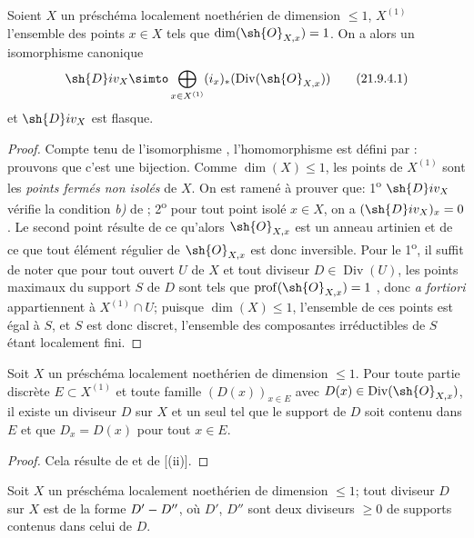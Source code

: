 \begin{proposition}[21.9.4]
\label{IV.21.9.4}
Soient $X$ un préschéma localement noethérien de dimension $\leq1$, $X^{(1)}$ l'ensemble des points $x\in X$ tels que $\dim(\sh{O}_{X,x})=1$.
On a alors un isomorphisme canonique
\[
\label{IV.21.9.4.1}
  \sh{D}iv_X\simto\bigoplus_{x\in X^{(1)}}(i_x)_*(\operatorname{Div}(\sh{O}_{X,x}))
  \tag{21.9.4.1}
\]
et $\sh{D}iv_X$ est flasque.
\end{proposition}

\begin{proof}
Compte tenu de l'isomorphisme , l'homomorphisme  est défini par :
prouvons que c'est une bijection.
Comme $\dim(X)\leq1$, les points de $X^{(1)}$ sont les \emph{points fermés non isolés} de $X$.
On est ramené à prouver que:
1\textsuperscript{o} $\sh{D}iv_X$ vérifie la condition \emph{b)} de ;
2\textsuperscript{o} pour tout point isolé $x\in X$, on a $(\sh{D}iv_X)_x=0$.
Le second point résulte de ce qu'alors $\sh{O}_{X,x}$ est un anneau artinien et de ce que tout élément régulier de $\sh{O}_{X,x}$ est donc inversible.
Pour le 1\textsuperscript{o}, il suffit de noter que pour tout ouvert $U$ de $X$ et tout diviseur $D\in\operatorname{Div}(U)$, les points maximaux du support $S$ de $D$ sont tels que
$\operatorname{prof}(\sh{O}_{X,x})=1$ , donc \emph{a fortiori} appartiennent à $X^{(1)}\cap U$;
puisque $\dim(X)\leq1$, l'ensemble de ces points est égal à $S$, et $S$ est donc discret, l'ensemble des composantes irréductibles de $S$ étant localement fini.
\end{proof}

\begin{corollary}[21.9.5]
\label{IV.21.9.5}
Soit $X$ un préschéma localement noethérien de dimension $\leq1$.
Pour toute partie discrète $E\subset X^{(1)}$ et toute famille $(D(x))_{x\in E}$ avec $D(x)\in\operatorname{Div}(\sh{O}_{X,x})$, il existe un diviseur $D$ sur $X$ et un seul tel que le support de $D$ soit contenu dans $E$ et que $D_x=D(x)$ pour tout $x\in E$.
\end{corollary}

\begin{proof}
Cela résulte de  et de [(ii)].
\end{proof}

\begin{corollary}[21.9.6]
\label{IV.21.9.6}
Soit $X$ un préschéma localement noethérien de dimension $\leq1$;
tout diviseur $D$ sur $X$ est de la forme $D'- D''$, où $D'$, $D''$ sont deux diviseurs $\geq0$ de supports contenus dans celui de $D$.
\end{corollary}

